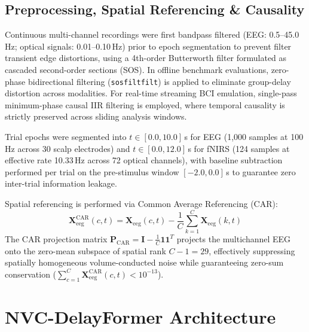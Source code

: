 \documentclass[journal]{IEEEtran}
\begin{document}
\subsection{Preprocessing, Spatial Referencing \& Causality}
Continuous multi-channel recordings were first bandpass filtered (EEG: 0.5--45.0\,Hz; optical signals: 0.01--0.10\,Hz) prior to epoch segmentation to prevent filter transient edge distortions, using a 4th-order Butterworth filter formulated as cascaded second-order sections (SOS). In offline benchmark evaluations, zero-phase bidirectional filtering (\texttt{sosfiltfilt}) is applied to eliminate group-delay distortion across modalities. For real-time streaming BCI emulation, single-pass minimum-phase causal IIR filtering is employed, where temporal causality is strictly preserved across sliding analysis windows.

Trial epochs were segmented into $t \in [0.0, 10.0]$\,s for EEG (1,000 samples at 100\,Hz across 30 scalp electrodes) and $t \in [0.0, 12.0]$\,s for fNIRS (124 samples at effective rate 10.33\,Hz across 72 optical channels), with baseline subtraction performed per trial on the pre-stimulus window $[-2.0, 0.0]$\,s to guarantee zero inter-trial information leakage.

Spatial referencing is performed via Common Average Referencing (CAR):
\begin{equation}
\mathbf{X}_{\text{eeg}}^{\text{CAR}}(c, t) = \mathbf{X}_{\text{eeg}}(c, t) - \frac{1}{C} \sum_{k=1}^C \mathbf{X}_{\text{eeg}}(k, t)
\end{equation}
The CAR projection matrix $\mathbf{P}_{\text{CAR}} = \mathbf{I} - \frac{1}{C}\mathbf{1}\mathbf{1}^T$ projects the multichannel EEG onto the zero-mean subspace of spatial rank $C - 1 = 29$, effectively suppressing spatially homogeneous volume-conducted noise while guaranteeing zero-sum conservation ($\sum_{c=1}^C \mathbf{X}_{\text{eeg}}^{\text{CAR}}(c, t) < 10^{-13}$).

\section{NVC-DelayFormer Architecture}
\end{document}
